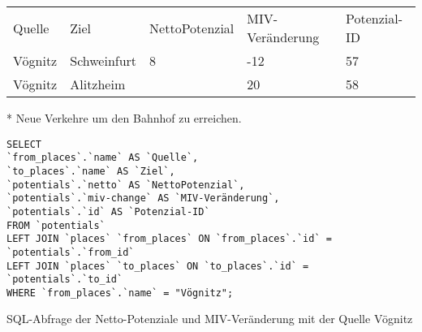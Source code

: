 \begin{tabularx}{\textwidth}{*5{X}}
Quelle & Ziel & NettoPotenzial & MIV-Veränderung & Potenzial-ID\\ 
Vögnitz & Schweinfurt & 8 & -12 & 57\\ 
Vögnitz & Alitzheim &  & 20 & 58\\ 
\end{tabularx}
\newline
\newline
* Neue Verkehre um den Bahnhof zu erreichen.
\newline
\begin{listing}[htbp]
\begin{verbatim}
SELECT
`from_places`.`name` AS `Quelle`, 
`to_places`.`name` AS `Ziel`, 
`potentials`.`netto` AS `NettoPotenzial`, 
`potentials`.`miv-change` AS `MIV-Veränderung`, 
`potentials`.`id` AS `Potenzial-ID`
FROM `potentials`
LEFT JOIN `places` `from_places` ON `from_places`.`id` = `potentials`.`from_id`
LEFT JOIN `places` `to_places` ON `to_places`.`id` = `potentials`.`to_id`
WHERE `from_places`.`name` = "Vögnitz";
\end{verbatim}
\caption{SQL-Abfrage der Netto-Potenziale und MIV-Veränderung mit der Quelle Vögnitz}\label{lst-fz-voegnitz}
\end{listing}